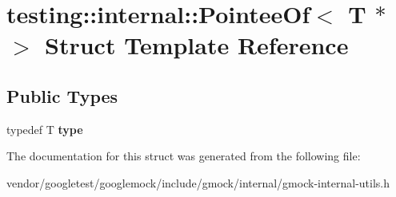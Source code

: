\hypertarget{structtesting_1_1internal_1_1PointeeOf_3_01T_01_5_01_4}{}\section{testing\+:\+:internal\+:\+:Pointee\+Of$<$ T $\ast$ $>$ Struct Template Reference}
\label{structtesting_1_1internal_1_1PointeeOf_3_01T_01_5_01_4}
\subsection*{Public Types}
\begin{DoxyCompactItemize}
\item 
typedef T {\bfseries type}\hypertarget{structtesting_1_1internal_1_1PointeeOf_3_01T_01_5_01_4_a91dde514cd3a8c07cedbe5336c36a55f}{}\label{structtesting_1_1internal_1_1PointeeOf_3_01T_01_5_01_4_a91dde514cd3a8c07cedbe5336c36a55f}

\end{DoxyCompactItemize}


The documentation for this struct was generated from the following file\+:\begin{DoxyCompactItemize}
\item 
vendor/googletest/googlemock/include/gmock/internal/gmock-\/internal-\/utils.\+h\end{DoxyCompactItemize}
